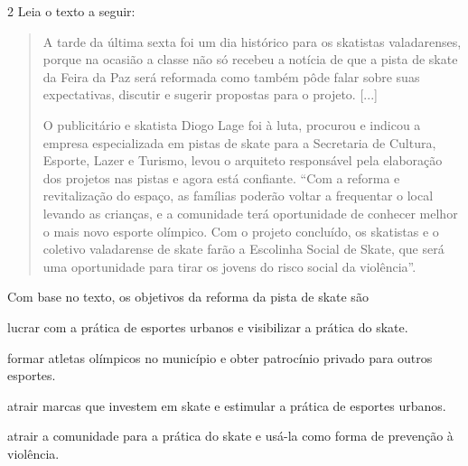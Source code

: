 \num{2} Leia o texto a seguir:

\begin{quote}
A tarde da última sexta foi um dia histórico para os skatistas
valadarenses, porque na ocasião a classe não só recebeu a notícia de
que a pista de skate da Feira da Paz será reformada como também pôde
falar sobre suas expectativas, discutir e sugerir propostas para o
projeto. {[}...{]}

O publicitário e skatista Diogo Lage foi à luta, procurou e indicou a
empresa especializada em pistas de skate para a Secretaria de Cultura, Esporte, Lazer e Turismo, levou o
arquiteto responsável pela elaboração dos projetos nas pistas e agora
está confiante. ``Com a reforma e revitalização do espaço, as famílias
poderão voltar a frequentar o local levando as crianças, e a comunidade
terá oportunidade de conhecer melhor o mais novo esporte olímpico. Com o
projeto concluído, os skatistas e o coletivo valadarense de skate farão a
Escolinha Social de Skate, que será uma oportunidade para tirar os
jovens do risco social da violência''.

\end{quote}

Com base no texto, os objetivos da reforma da pista de skate são

\begin{escolha}
\item lucrar com a prática de esportes urbanos e visibilizar a prática do skate.

\item formar atletas olímpicos no município e obter patrocínio privado para outros esportes.

\item atrair marcas que investem em skate e estimular a prática de esportes urbanos. 

\item atrair a comunidade para a prática do skate e usá-la como forma de prevenção à violência.
\end{escolha}

